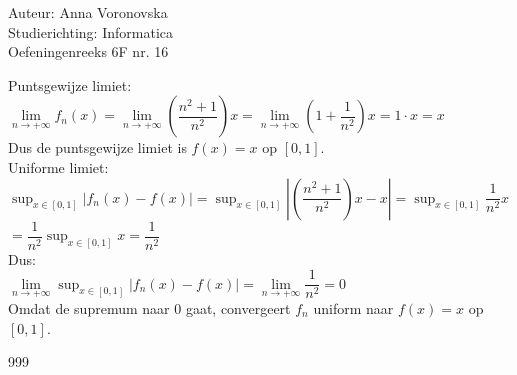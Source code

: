 \documentclass[a4paper]{article}
\begin{document}
  
\noindent \large Auteur: Anna Voronovska \\
\noindent \large Studierichting: Informatica\\
\noindent \large Oefeningenreeks 6F nr. 16\\

\medskip

\normalsize

Puntsgewijze limiet:\\

$\lim\limits_{n \to +\infty} f_n(x) = \lim\limits_{n \to +\infty} \left(\dfrac{n^2+1}{n^2}\right)x = \lim\limits_{n \to +\infty} \left(1 + \dfrac{1}{n^2}\right)x = 1 \cdot x = x$\\

Dus de puntsgewijze limiet is $f(x) = x$ op $[0,1]$.\\

Uniforme limiet:\\

$\displaystyle\sup_{x \in [0,1]} \left|f_n(x) - f(x)\right| = \displaystyle\sup_{x \in [0,1]} \left|\left(\dfrac{n^2+1}{n^2}\right)x - x\right| = \displaystyle\sup_{x \in [0,1]} \dfrac{1}{n^2} x $\\

$= \dfrac{1}{n^2} \displaystyle\sup_{x \in [0,1]} x = \dfrac{1}{n^2}$\\

Dus:\\

$\lim\limits_{n \to +\infty} \displaystyle\sup_{x \in [0,1]} \left|f_n(x) - f(x)\right| = \lim\limits_{n \to +\infty} \dfrac{1}{n^2} = 0$\\

Omdat de supremum naar $0$ gaat, convergeert $f_n$ uniform naar $f(x) = x$ op $[0,1]$.



\begin{thebibliography}{999}
\end{thebibliography}
\end{document}
